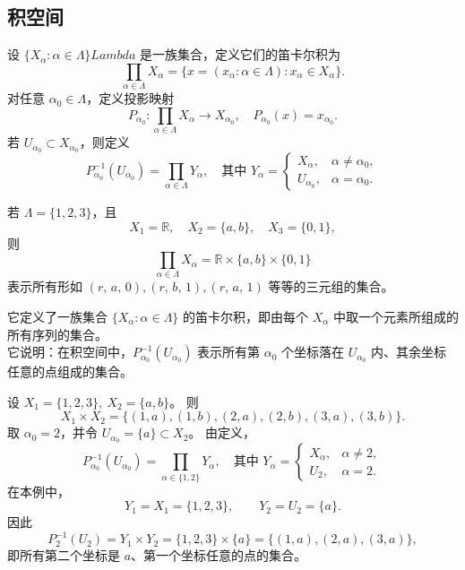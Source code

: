 \subsection{积空间}
\begin{definition}[笛卡尔积的定义]
设 \(\{X_\alpha : \alpha \in \Lambda\}Lambda\) 是一族集合，定义它们的笛卡尔积为
\[
\prod_{\alpha \in \Lambda} X_\alpha = \{x = (x_\alpha : \alpha \in \Lambda) : x_\alpha \in X_\alpha\}.
\]
对任意 \(\alpha_0 \in \Lambda\)，定义投影映射
\[
P_{\alpha_0} : \prod_{\alpha \in \Lambda} X_\alpha \to X_{\alpha_0}, \quad P_{\alpha_0}(x) = x_{\alpha_0}.
\]
若 \(U_{\alpha_0} \subset X_{\alpha_0}\)，则定义
\[
P_{\alpha_0}^{-1}(U_{\alpha_0}) = \prod_{\alpha \in \Lambda} Y_\alpha,
\quad \text{其中 } 
Y_\alpha =
\begin{cases}
X_\alpha, & \alpha \ne \alpha_0,\\
U_{\alpha_0}, & \alpha = \alpha_0.
\end{cases}
\]
\end{definition}
\begin{example}
若 \(\Lambda = \{1,2,3\}\)，且
\[
X_1 = \mathbb{R}, \quad X_2 = \{a,b\}, \quad X_3 = \{0,1\},
\]
则
\[
\prod_{\alpha\in\Lambda} X_\alpha
= \mathbb{R} \times \{a,b\} \times \{0,1\}
\]
表示所有形如 \((r,\,a,\,0), (r,\,b,\,1), (r,\,a,\,1)\) 等等的三元组的集合。


\end{example}
\begin{note}
 它定义了一族集合 \(\{X_\alpha : \alpha \in \Lambda\}\) 的笛卡尔积，即由每个 \(X_\alpha\) 中取一个元素所组成的所有序列的集合。  \\
 它说明：在积空间中，\(P_{\alpha_0}^{-1}(U_{\alpha_0})\) 表示所有第 \(\alpha_0\) 个坐标落在 \(U_{\alpha_0}\) 内、其余坐标任意的点组成的集合。
\end{note}
\begin{example}[具体数值示例]
设 \(X_1 = \{1,2,3\},\ X_2 = \{a,b\}\)。  
则
\[
X_1 \times X_2 = \{(1,a), (1,b), (2,a), (2,b), (3,a), (3,b)\}.
\]
取 \(\alpha_0 = 2\)，并令 \(U_{\alpha_0} = \{a\} \subset X_2\)。  
由定义，
\[
P_{\alpha_0}^{-1}(U_{\alpha_0})
= \prod_{\alpha \in \{1,2\}} Y_\alpha,
\quad \text{其中 } 
Y_\alpha =
\begin{cases}
X_\alpha, & \alpha \ne 2,\\[4pt]
U_2, & \alpha = 2.
\end{cases}
\]
在本例中，
\[
Y_1 = X_1 = \{1,2,3\}, \qquad Y_2 = U_2 = \{a\}.
\]
因此
\[
P_2^{-1}(U_2)
= Y_1 \times Y_2
= \{1,2,3\} \times \{a\}
= \{(1,a), (2,a), (3,a)\},
\]
即所有第二个坐标是 \(a\)、第一个坐标任意的点的集合。
\end{example}
